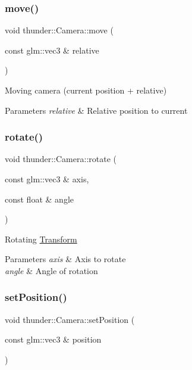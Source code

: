 \subsubsection{\texorpdfstring{move()}{move()}}
{\footnotesize\ttfamily void thunder\+::\+Camera\+::move (\begin{DoxyParamCaption}\item[{const glm\+::vec3 \&}]{relative }\end{DoxyParamCaption})}

Moving camera (current position + relative)


\begin{DoxyParams}{Parameters}
{\em relative} & Relative position to current \\
\hline
\end{DoxyParams}
\mbox{\label{classthunder_1_1_camera_adaf17dcb64874463c4df918d9fc1a736}} 
\subsubsection{\texorpdfstring{rotate()}{rotate()}}
{\footnotesize\ttfamily void thunder\+::\+Camera\+::rotate (\begin{DoxyParamCaption}\item[{const glm\+::vec3 \&}]{axis,  }\item[{const float \&}]{angle }\end{DoxyParamCaption})}

Rotating \mbox{\hyperlink{classthunder_1_1_transform}{Transform}}


\begin{DoxyParams}{Parameters}
{\em axis} & Axis to rotate \\
\hline
{\em angle} & Angle of rotation \\
\hline
\end{DoxyParams}
\mbox{\label{classthunder_1_1_camera_a6095f7b60a507434cb74e5fcb542183e}} 
\subsubsection{\texorpdfstring{set\+Position()}{setPosition()}}
{\footnotesize\ttfamily void thunder\+::\+Camera\+::set\+Position (\begin{DoxyParamCaption}\item[{const glm\+::vec3 \&}]{position }\end{DoxyParamCaption})}

